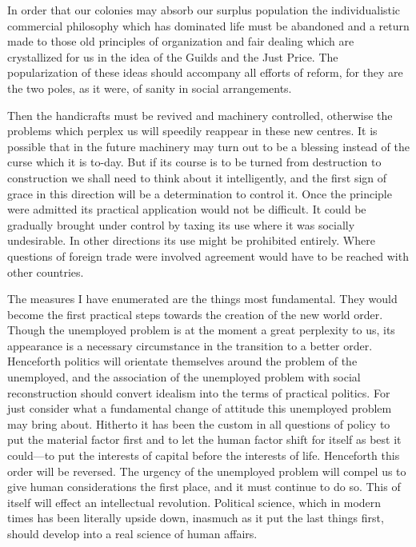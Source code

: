 \documentclass{book}
\begin{document}
In order that our colonies may absorb our surplus population the individualistic commercial philosophy which has dominated life must be abandoned and a return made to those old principles of organization and fair dealing which are crystallized for us in the idea of the Guilds and the Just Price. The popularization of these ideas should accompany all efforts of reform, for they are the two poles, as it were, of sanity in social arrangements.

Then the handicrafts must be revived and machinery controlled, otherwise the problems which perplex us will speedily reappear in these new centres. It is possible that in the future machinery may turn out to be a blessing instead of the curse which it is to-day. But if its course is to be turned from destruction to construction we shall need to think about it intelligently, and the first sign of grace in this direction will be a determination to control it. Once the principle were admitted its practical application would not be difficult. It could be gradually brought under control by taxing its use where it was socially undesirable. In other directions its use might be prohibited entirely. Where questions of foreign trade were involved agreement would have to be reached with other countries.

The measures I have enumerated are the things most fundamental. They would become the first practical steps towards the creation of the new world order. Though the unemployed problem is at the moment a great perplexity to us, its appearance is a necessary circumstance in the transition to a better order. Henceforth politics will orientate themselves around the problem of the unemployed, and the association of the unemployed problem with social reconstruction should convert idealism into the terms of practical politics. For just consider what a fundamental change of attitude this unemployed problem may bring about. Hitherto it has been the custom in all questions of policy to put the material factor first and to let the human factor shift for itself as best it could—to put the interests of capital before the interests of life. Henceforth this order will be reversed. The urgency of the unemployed problem will compel us to give human considerations the first place, and it must continue to do so. This of itself will effect an intellectual revolution. Political science, which in modern times has been literally upside down, inasmuch as it put the last things first, should develop into a real science of human affairs.
\end{document}
